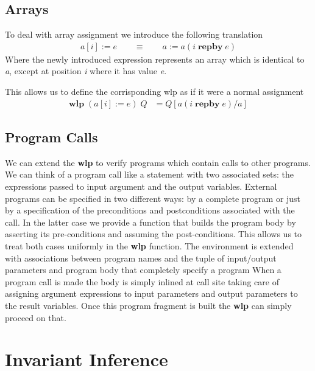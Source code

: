 \documentclass[]{scrartcl}
\newcommand{\WLP}[2]{\ensuremath{\mathbf{wlp}\;#1\;#2}}
\newcommand{\REPBY}[2]{\ensuremath{#1\;\mathbf{repby}\;#2}}
\begin{document}
\subsection{Arrays}

To deal with array assignment we introduce the following translation
\begin{align}
  a[i] := e \qquad \equiv \qquad a := a ( \REPBY{i}{e} )
\end{align}
Where the newly introduced expression represents an array which is identical to
\emph{a}, except at position \emph{i} where it has value \emph{e}.

This allows us to define the corrisponding wlp as if it were a normal assignment
\begin{align}
  \WLP{(a[i] := e)}{Q} &= Q[a( \REPBY{i}{e} ) / a]
\end{align}

\subsection{Program Calls}

We can extend the \textbf{wlp} to verify programs which contain calls to other programs.
We can think of a program call like a statement with two associated sets:
the expressions passed to input argument and the output variables.
External programs can be specified in two different ways: by a complete program or
just by a specification of the preconditions and postconditions associated with
the call.
In the latter case we provide a function that builds the program body by asserting
its pre-conditions and assuming the post-conditions.
This allows us to treat both cases uniformly in the \textbf{wlp} function.
The environment is extended with associations between program names and the
tuple of input/output parameters and program body that completely specify a program
When a program call is made the body is simply inlined at call site taking care
of assigning argument expressions to input parameters and output parameters to the result variables.
Once this program fragment is built the \textbf{wlp} can simply proceed on that.

\section{Invariant Inference}
\end{document}
